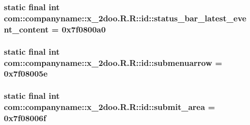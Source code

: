 \hypertarget{classcom_1_1companyname_1_1x__2doo_1_1_r_1_1id_d721ed9b7805c84805f9c85c41c96d2c}{
\subsubsection[{status\_\-bar\_\-latest\_\-event\_\-content}]{\setlength{\rightskip}{0pt plus 5cm}static final int com::companyname::x\_\-2doo.R.R::id::status\_\-bar\_\-latest\_\-event\_\-content = 0x7f0800a0}}
\label{classcom_1_1companyname_1_1x__2doo_1_1_r_1_1id_d721ed9b7805c84805f9c85c41c96d2c}


\hypertarget{classcom_1_1companyname_1_1x__2doo_1_1_r_1_1id_7db5dd54ea46fe0ab4a08def90de1af6}{
\subsubsection[{submenuarrow}]{\setlength{\rightskip}{0pt plus 5cm}static final int com::companyname::x\_\-2doo.R.R::id::submenuarrow = 0x7f08005e}}
\label{classcom_1_1companyname_1_1x__2doo_1_1_r_1_1id_7db5dd54ea46fe0ab4a08def90de1af6}


\hypertarget{classcom_1_1companyname_1_1x__2doo_1_1_r_1_1id_85de3e84f64e8ee75ea32a626dbe9692}{
\subsubsection[{submit\_\-area}]{\setlength{\rightskip}{0pt plus 5cm}static final int com::companyname::x\_\-2doo.R.R::id::submit\_\-area = 0x7f08006f}}
\label{classcom_1_1companyname_1_1x__2doo_1_1_r_1_1id_85de3e84f64e8ee75ea32a626dbe9692}


